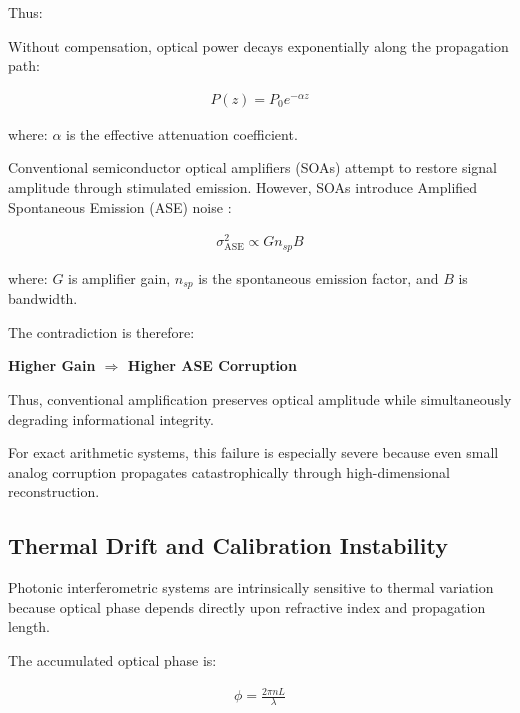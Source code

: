 \documentclass[journal]{IEEEtran}
\begin{document}
Thus:

\begin{center}
\end{center}


Without compensation, optical power decays exponentially along the propagation path:

\begin{align}
P(z) = P_0 e^{-\alpha z}
\label{eq:loss_exponential}
\end{align}

where: $\alpha$ is the effective attenuation coefficient.

Conventional semiconductor optical amplifiers (SOAs) attempt to restore signal amplitude through stimulated emission. However, SOAs introduce Amplified Spontaneous Emission (ASE) noise \cite{Winzer2006,Saleh2019}:

\begin{align}
\sigma^2_{\mathrm{ASE}} \propto Gn_{sp}B
\label{eq:ase_noise}
\end{align}

where: $G$ is amplifier gain, $n_{sp}$ is the spontaneous emission factor, and $B$ is bandwidth.

The contradiction is therefore:

\begin{center}
\textbf{Higher Gain $\Longrightarrow$ Higher ASE Corruption}
\label{eq:gain_contradiction}
\end{center}

Thus, conventional amplification preserves optical amplitude while simultaneously degrading informational integrity.

For exact arithmetic systems, this failure is especially severe because even small analog corruption propagates catastrophically through high-dimensional reconstruction.

\subsection{\textbf{Thermal Drift and Calibration Instability}}

Photonic interferometric systems are intrinsically sensitive to thermal variation because optical phase depends directly upon refractive index and propagation length.

The accumulated optical phase is:

\begin{align}
\phi = \frac{2\pi nL}{\lambda}
\label{eq:phase_equation}
\end{align}
\end{document}
